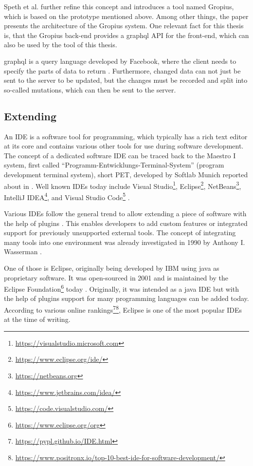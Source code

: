 Speth et al. \cite{speth2020gropius} further refine this concept and introduces a tool named \gls{Gropius}, which is  based on the prototype mentioned above.
Among other things, the paper presents the architecture of the \gls{Gropius} system. 
One relevant fact for this thesis is, that the \gls{Gropius} back-end provides a \gls{graphql} \gls{API} for the front-end,
which can also be used by the tool of this thesis.

\gls{graphql} is a query language developed by Facebook, where the client needs to specify the parts of data to return \cite{grpahql2018}.
Furthermore, changed data can not just be sent to the server to be updated, but the changes must be recorded and split into so-called mutations,
which can then be sent to the server.

\subsection{Extending }
\label{ssec:ch2:ss1.3}
An \gls{IDE} is a software tool for programming, which typically has a rich text editor at its core 
and contains various other tools for use during software development.
The concept of a dedicated software \gls{IDE} can be traced back to the Maestro I system, first called ``Programm-Entwicklungs-Terminal-System'' (program development terminal system), short PET, developed by Softlab Munich reported about in \cite{Computerwoche1975Ide}.
Well known \glspl{IDE} today include Visual Studio\footnote{\url{https://visualstudio.microsoft.com}}, \gls{Eclipse}\footnote{\url{https://www.eclipse.org/ide/}}, NetBeans\footnote{\url{https://netbeans.org}}, IntelliJ IDEA\footnote{\url{https://www.jetbrains.com/idea/}}, and Visual Studio Code\footnote{\url{https://code.visualstudio.com/}} .

Various \glspl{IDE} follow the general trend to allow extending a piece of software with the help of plugins \cite{chang2008issues}.
This enables developers to add custom features or integrated support for previously unsupported external tools.
The concept of integrating many tools into one environment was already investigated in 1990 by Anthony I. Wasserman \cite{wasserman1990tool}.

One of those is \gls{Eclipse}, originally being developed by IBM using \gls{java} as proprietary software.
It was open-sourced in 2001 and is maintained by the Eclipse Foundation\footnote{\url{https://www.eclipse.org/org}}
today \cite{burnette2005eclipse}.
Originally, it was intended as a \gls{java} \gls{IDE} but with the help of plugins support for many programming languages can be added today.
According to various online rankings\footnote{\url{https://pypl.github.io/IDE.html}}\footnote{\url{https://www.positronx.io/top-10-best-ide-for-software-development/}},
\gls{Eclipse} is one of the most popular \glspl{IDE} at the time of writing.


